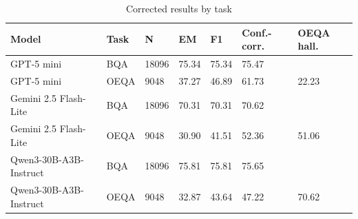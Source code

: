 \begin{table}[t]
\centering
\small
\begin{tabular}{lllllll}
\toprule
Model & Task & N & EM & F1 & Conf.-corr. & OEQA hall. \\
\midrule
GPT-5 mini & BQA & 18096 & 75.34 & 75.34 & 75.47 &  \\
GPT-5 mini & OEQA & 9048 & 37.27 & 46.89 & 61.73 & 22.23 \\
Gemini 2.5 Flash-Lite & BQA & 18096 & 70.31 & 70.31 & 70.62 &  \\
Gemini 2.5 Flash-Lite & OEQA & 9048 & 30.90 & 41.51 & 52.36 & 51.06 \\
Qwen3-30B-A3B-Instruct & BQA & 18096 & 75.81 & 75.81 & 75.65 &  \\
Qwen3-30B-A3B-Instruct & OEQA & 9048 & 32.87 & 43.64 & 47.22 & 70.62 \\
\bottomrule
\end{tabular}
\caption{Corrected results by task}
\label{tab:core-v11-corrected-results-by-task}
\end{table}
